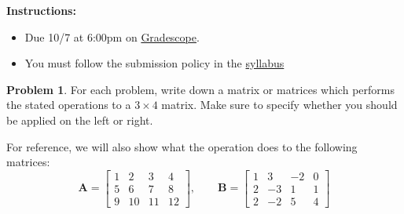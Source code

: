 \documentclass[12pt]{article}
\theoremstyle{definition}
\newtheorem{problem}{Problem}
\renewcommand{\vec}{\mathbf}
\begin{document}
\textbf{\Large{}}
    
    \vspace{-1.8em}
    \hrulefill
 
\textbf{Instructions:}
    \begin{itemize}
        \item Due 10/7 at 6:00pm on \href{https://www.gradescope.com/courses/818054}{Gradescope}.
        \item You must follow the submission policy in the \href{https://courses.chen.pw/na_f2024/syllabus.html}{syllabus} 
\end{itemize}
   
\vspace{.5em}


\begin{problem}
    For each problem, write down a matrix or matrices which performs the stated operations to a $3\times 4$ matrix.
    Make sure to specify whether you should be applied on the left or right.

    For reference, we will also show what the operation does to the following matrices:
    \[
        \vec{A} = 
        \begin{bmatrix}
            1 & 2 & 3 & 4 \\
            5 & 6 & 7 & 8 \\
            9 & 10 & 11 & 12
        \end{bmatrix}
        ,\qquad 
        \vec{B} = 
        \begin{bmatrix}
            1 & 3& -2 & 0 \\
            2 & -3 & 1 & 1 \\
            2 & -2 & 5 & 4
        \end{bmatrix}
    \]


\end{problem}
\end{document}
